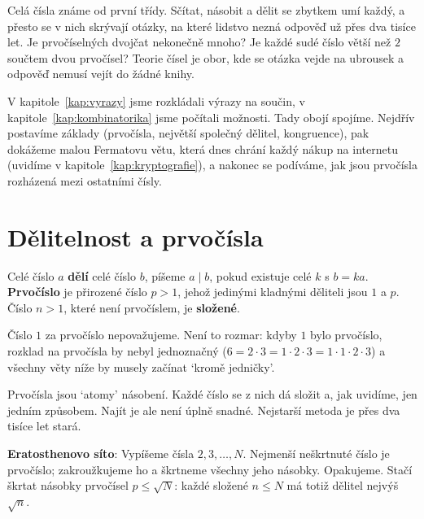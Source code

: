 \label{kap:teorie-cisel}

Celá čísla známe od první třídy. Sčítat, násobit a dělit se zbytkem umí každý, a přesto se v nich skrývají otázky, na které lidstvo nezná odpověď už přes dva tisíce let. Je prvočíselných dvojčat nekonečně mnoho? Je každé sudé číslo větší než $2$ součtem dvou prvočísel? Teorie čísel je obor, kde se otázka vejde na ubrousek a odpověď nemusí vejít do žádné knihy.

V kapitole~\ref{kap:vyrazy} jsme rozkládali výrazy na součin, v kapitole~\ref{kap:kombinatorika} jsme počítali možnosti. Tady obojí spojíme. Nejdřív postavíme základy (prvočísla, největší společný dělitel, kongruence), pak dokážeme malou Fermatovu větu, která dnes chrání každý nákup na internetu (uvidíme v kapitole~\ref{kap:kryptografie}), a nakonec se podíváme, jak jsou prvočísla rozházená mezi ostatními čísly.

\section{Dělitelnost a prvočísla}

\begin{definitionbox}
  Celé číslo $a$ \textbf{dělí} celé číslo $b$, píšeme $a\mid b$, pokud existuje celé $k$ s $b = ka$. \textbf{Prvočíslo} je přirozené číslo $p > 1$, jehož jedinými kladnými děliteli jsou $1$ a $p$. Číslo $n > 1$, které není prvočíslem, je \textbf{složené}.
\end{definitionbox}

Číslo $1$ za prvočíslo nepovažujeme. Není to rozmar: kdyby $1$ bylo prvočíslo, rozklad na prvočísla by nebyl jednoznačný ($6 = 2\cdot 3 = 1\cdot 2\cdot 3 = 1\cdot 1\cdot 2\cdot 3$) a všechny věty níže by musely začínat `kromě jedničky'.

Prvočísla jsou `atomy' násobení. Každé číslo se z nich dá složit a, jak uvidíme, jen jedním způsobem. Najít je ale není úplně snadné. Nejstarší metoda je přes dva tisíce let stará.

\begin{definitionbox}
  \textbf{Eratosthenovo síto}: Vypíšeme čísla $2, 3, \ldots, N$. Nejmenší neškrtnuté číslo je prvočíslo; zakroužkujeme ho a škrtneme všechny jeho násobky. Opakujeme. Stačí škrtat násobky prvočísel $p\leq\sqrt{N}$: každé složené $n\leq N$ má totiž dělitel nejvýš $\sqrt{n}$.
\end{definitionbox}

